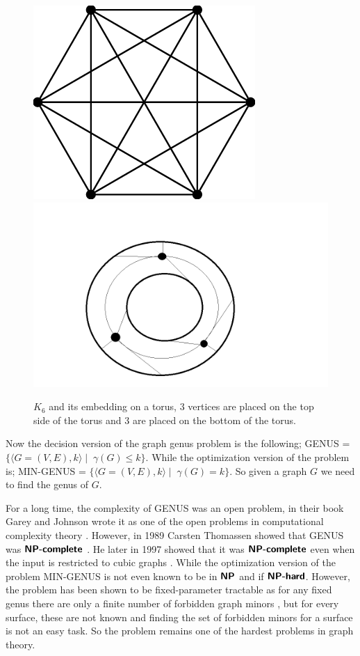 \documentclass{article}
\newcommand{\classX}[1]{\ensuremath{\text{\textsf{\textbf{#1}}}}}
\newcommand{\classNP}{\classX{NP}}
\newcommand{\NPC}{\classX{NP-complete}}
\newcommand{\NPH}{\classX{NP-hard}}
\begin{document}
    \begin{figure}[h]
        \includegraphics[scale = 0.5]{The-complete-graph-K-6.png} 
        \hspace*{1cm}
        \includegraphics[scale = 0.4]{torus k6.png} 
        \caption{$K_6$ and its embedding on a torus, 3 vertices are placed on the top side of the torus and 3 are placed on the bottom of the torus.}
        \label{Fig4}
    \end{figure}

    Now the decision version of the graph genus problem is the following; GENUS = $\{\langle G = (V, E), k\rangle\mid \; \gamma(G) \leq k\}$.
    While the optimization version of the problem is; MIN-GENUS = $\{\langle G = (V, E), k\rangle\mid \; \gamma(G) = k\}$.
    So given a graph $G$ we need to find the genus of $G$. 

    For a long time, the complexity of GENUS was an open problem, in their book Garey and Johnson wrote it as one of the open problems in computational complexity theory \cite{GareyJohnson90}. 
    However, in 1989 Carsten Thomassen showed that GENUS was $\NPC$ \cite{Thomassen89}. He later in 1997 showed that it was $\NPC$ even when the input is restricted to cubic graphs \cite{Thomassen97}.
    While the optimization version of the problem MIN-GENUS is not even known to be in $\classNP$ and if $\NPH$. However, the problem has been shown to be fixed-parameter tractable as for any fixed genus there are only a finite number of forbidden graph minors \cite{Beyer16}, but for every surface, these are not known and finding the set of forbidden minors for a surface is not an easy task.
    So the problem remains one of the hardest problems in graph theory.
    
\end{document}

